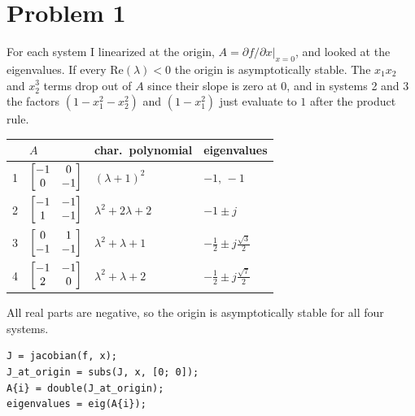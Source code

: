 \section*{Problem 1}

For each system I linearized at the origin, $A=\partial f/\partial x\big|_{x=0}$, and looked at the eigenvalues. If every $\mathrm{Re}(\lambda)<0$ the origin is asymptotically stable. The $x_1x_2$ and $x_2^3$ terms drop out of $A$ since their slope is zero at $0$, and in systems 2 and 3 the factors $(1-x_1^2-x_2^2)$ and $(1-x_1^2)$ just evaluate to $1$ after the product rule.

\begin{center}
\begin{tabular}{clll}
\toprule
 & $A$ & char.\ polynomial & eigenvalues\\
\midrule
1 & $\begin{bmatrix}-1&0\\0&-1\end{bmatrix}$ & $(\lambda+1)^2$ & $-1,\,-1$\\[6pt]
2 & $\begin{bmatrix}-1&-1\\1&-1\end{bmatrix}$ & $\lambda^2+2\lambda+2$ & $-1\pm j$\\[6pt]
3 & $\begin{bmatrix}0&1\\-1&-1\end{bmatrix}$ & $\lambda^2+\lambda+1$ & $-\tfrac12\pm j\tfrac{\sqrt3}{2}$\\[6pt]
4 & $\begin{bmatrix}-1&-1\\2&0\end{bmatrix}$ & $\lambda^2+\lambda+2$ & $-\tfrac12\pm j\tfrac{\sqrt7}{2}$\\
\bottomrule
\end{tabular}
\end{center}

All real parts are negative, so the origin is asymptotically stable for all four systems.

\begin{lstlisting}
J = jacobian(f, x);
J_at_origin = subs(J, x, [0; 0]);
A{i} = double(J_at_origin);
eigenvalues = eig(A{i});
\end{lstlisting}
